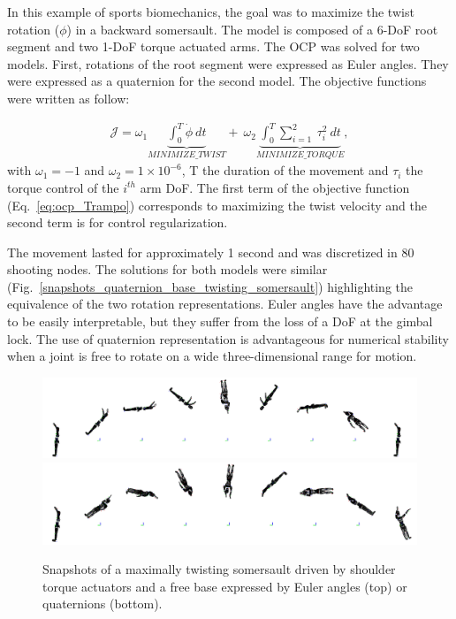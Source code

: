 In this example of sports biomechanics, the goal was to maximize the twist rotation ($\phi$) in a backward somersault.
The model is composed of a 6-DoF root segment and two 1-DoF torque actuated arms.
The OCP was solved for two models.
First, rotations of the root segment were expressed as Euler angles.
They were expressed as a quaternion for the second model.
The objective functions were written as follow:

\begin{eqnarray}\label{eq:ocp_Trampo}
\mathcal{J} = \omega_1 \underbrace{\int_0^T \dot{\phi}~dt}_{MINIMIZE\_TWIST}  +~\omega_2 \underbrace{\int_0^T \sum_{i=1}^{2}~\tau_{i}^2~dt}_{MINIMIZE\_ TORQUE},
\end{eqnarray}
with $\omega_1 = -1$ and $\omega_2 = 1\times 10^{-6}$, T the duration of the movement and $\tau_{i}$ the torque control of the $i^{th}$ arm DoF.
The first term of the objective function (Eq.~\ref{eq:ocp_Trampo}) corresponds to maximizing the twist velocity and the second term is for control regularization.


The movement lasted for approximately 1 second and was discretized in 80 shooting nodes.
The solutions for both models were similar (Fig.~\ref{snapshots_quaternion_base_twisting_somersault}) highlighting the equivalence of the two rotation representations.
Euler angles have the advantage to be easily interpretable, but they suffer from the loss of a DoF at the gimbal lock.
The use of quaternion representation is advantageous for numerical stability when a joint is free to rotate on a wide three-dimensional range for motion.


\begin{figure}[t!]
\centering
\includegraphics[width=\textwidth]{figures/Euler_Bioptim_MaxVrille_dos.png}\\
\vspace*{0.5em}
\includegraphics[width=\textwidth]{figures/Quat_Bioptim_MaxVrille_dos.png}
\caption{Snapshots of a maximally twisting somersault driven by shoulder torque actuators and a free base expressed by Euler angles (top) or quaternions (bottom).}
\label{fig:snapshots_quaternion_base_twisting_somersault}
\end{figure}


